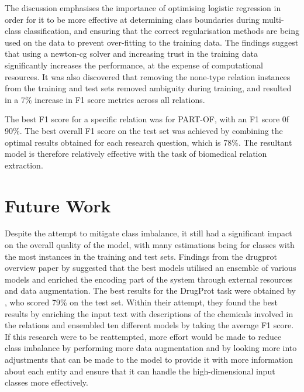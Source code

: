 \documentclass{l4proj}
\begin{document}
The discussion emphasises the importance of optimising logistic regression in order for it to be more effective at determining class boundaries during multi-class classification, and ensuring that the correct regularisation methods are being used on the data to prevent over-fitting to the training data. The findings suggest that using a newton-cg solver and increasing trust in the training data significantly increases the performance, at the expense of computational resources. It was also discovered that removing the none-type relation instances from the training and test sets removed ambiguity during training, and resulted in a 7\% increase in F1 score metrics across all relations.

The best F1 score for a specific relation was for PART-OF, with an F1 score 0f 90\%. The best overall F1 score on the test set was achieved by combining the optimal results obtained for each research question, which is 78\%. The resultant model is therefore relatively effective with the task of biomedical relation extraction.

\newpage
\section{Future Work}
Despite the attempt to mitigate class imbalance, it still had a significant impact on the overall quality of the model, with many estimations being for classes with the most instances in the training and test sets. Findings from the drugprot overview paper by \cite{overview} suggested that the best models utilised an ensemble of various models and enriched the encoding part of the system through external resources and data augmentation. The best results for the DrugProt task were obtained by \cite{humboldt}, who scored 79\% on the test set. Within their attempt, they found the best results by enriching the input text with descriptions of the chemicals involved in the relations and ensembled ten different models by taking the average F1 score. If this research were to be reattempted, more effort would be made to reduce class imbalance by performing more data augmentation and by looking more into adjustments that can be made to the model to provide it with more information about each entity and ensure that it can handle the high-dimensional input classes more effectively.
\end{document}
